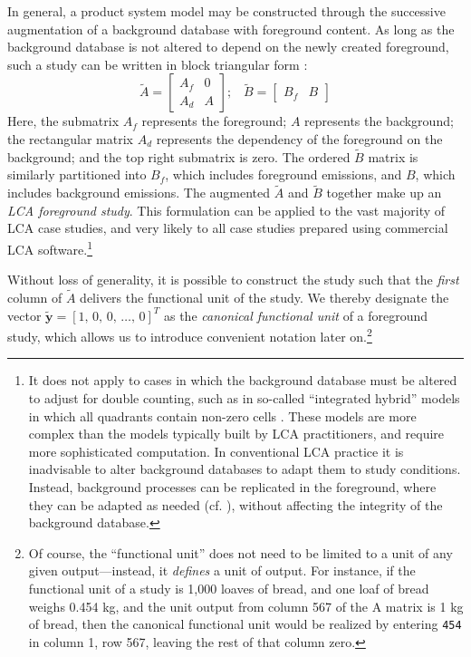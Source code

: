 In general, a product system model may be constructed through the successive augmentation of a background database with foreground content.  As long as the background database is not altered to depend on the newly created foreground, such a study can be written in block triangular form \citep{Kuczenski_JLCA_2015}:
\begin{equation}
\tilde{A} = \left[\begin{array}{cc}
A_f & 0 \\
A_d &  A
  \end{array}
\right];\;\;\;
  \tilde{B} = \left[\begin{array}{cc} B_f & B   \end{array}\right]
\label{eqn:foreground}
\end{equation}
Here, the submatrix $A_f$ represents the foreground; $A$ represents the background; the rectangular matrix $A_d$ represents the dependency of the foreground on the background; and the top right submatrix is zero.  The ordered $\tilde{B}$ matrix is similarly partitioned into $B_f$, which includes foreground emissions, and $B$, which includes background emissions. %
The augmented $\tilde{A}$ and $\tilde{B}$ together make up an \emph{LCA foreground study}.  This formulation can be applied to the vast majority of LCA case studies, and very likely to all case studies prepared using commercial LCA software.\footnote{It does not apply to cases in which the background database must be altered to adjust for double counting, such as in so-called ``integrated hybrid'' models in which all quadrants contain non-zero cells \citep{Suh2004}.  These models are more complex than the models typically built by LCA practitioners, and require more sophisticated computation.  In conventional LCA practice it is inadvisable to alter background databases to adapt them to study conditions.  Instead, background processes can be replicated in the foreground, where they can be adapted as needed (cf. \cite{Bourgault_JLCA_2013}), without affecting the integrity of the background database.}

Without loss of generality, it is possible to construct the study such that the \textit{first} column of $\tilde{A}$ delivers the functional unit of the study.  We thereby designate the vector $\tilde{\mathbf{y}} =  [ 1,\, 0,\, 0 ,\,\ldots,\, 0]^{T}$ as the \textit{canonical functional unit} of a foreground study, which allows us to introduce convenient notation later on.\footnote{Of course, the ``functional unit'' does not need to be limited to a unit of any given output---instead, it \textit{defines} a unit of output. For instance, if the functional unit of a study is 1,000 loaves of bread, and one loaf of bread weighs 0.454 kg, and the unit output from column 567 of the A matrix is 1 kg of bread, then the canonical functional unit would be realized by entering \texttt{454} in column 1, row 567, leaving the rest of that column zero.}

